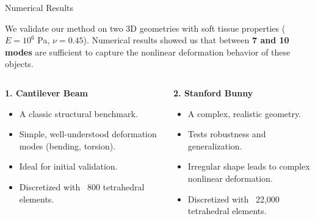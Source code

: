 \documentclass{beamer}
\begin{document}
\begin{frame}{Numerical Results}
    
    We validate our method on two 3D geometries with soft tissue properties ($E = 10^6$ Pa, $\nu = 0.45$). Numerical results showed us that between \textbf{7 and 10 modes} are sufficient to capture the nonlinear deformation behavior of these objects.
    
    \begin{columns}[T]
        \begin{column}{0.45\textwidth}
            \textbf{1. Cantilever Beam}
            \begin{itemize}
                \item A classic structural benchmark.
                \item Simple, well-understood deformation modes (bending, torsion).
                \item Ideal for initial validation.
                \item Discretized with ~800 tetrahedral elements.
            \end{itemize}
        \end{column}
        
        \begin{column}{0.55\textwidth}
            \textbf{2. Stanford Bunny}
            \begin{itemize}
                \item A complex, realistic geometry.
                \item Tests robustness and generalization.
                \item Irregular shape leads to complex nonlinear deformation.
                \item Discretized with ~22,000 tetrahedral elements.
            \end{itemize}
    
        \end{column}
    \end{columns}
\end{frame}
\end{document}

